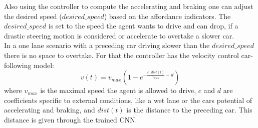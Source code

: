 Also using the controller to compute the accelerating and braking one can adjust the desired speed ($desired\_speed$) based on the affordance indicators. The $desired\_speed$ is set to the speed the agent wants to drive and can drop, if a drastic steering motion is considered or accelerate to overtake a slower car.\\
In a one lane scenario with a  preceding car driving slower than the $desired\_speed$ there is no space to overtake. For that the controller has the velocity control car-following model:
	$$ v(t) = v_{max}(1-e^{-\frac{c\cdot dist(t)}{v_{max}} -d})$$ 
where $v_{max}$ is the maximal speed the agent is allowed to drive, $c$ and $d$ are coefficients specific to external conditions, like a wet lane or the cars potential of accelerating and braking, and $dist(t)$ is the distance to the preceding car. This distance is given through the trained CNN.




